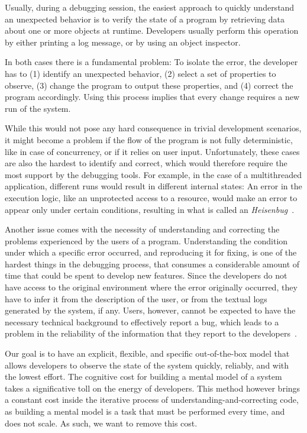 Usually, during a debugging session, the easiest approach to quickly understand an unexpected behavior is to verify the state of a program by retrieving data about one or more objects at runtime. Developers usually perform this operation by either printing a log message, or by using an object inspector.

In both cases there is a fundamental problem: To isolate the error, the developer has to (1) identify an unexpected behavior, (2) select a set of properties to observe, (3) change the program to output these properties, and (4) correct the program accordingly. Using this process implies that every change requires a new run of the system.

While this would not pose any hard consequence in trivial development scenarios, it might become a problem if the flow of the program is not fully deterministic, like in case of concurrency, or if it relies on user input. Unfortunately, these cases are also the hardest to identify and correct, which would therefore require the most support by the debugging tools. For example, in the case of a multithreaded application, different runs would result in different internal states: An error in the execution logic, like an unprotected access to a resource, would make an error to appear only under certain conditions, resulting in what is called an \emph{Heisenbug}~\cite{Grot2005}.

Another issue comes with the necessity of understanding and correcting the problems experienced by the users of a program. Understanding the condition under which a specific error occurred, and reproducing it for fixing, is one of the hardest things in the debugging process, that consumes a considerable amount of time that could be spent to develop new features. Since the developers do not have access to the original environment where the error originally occurred, they have to infer it from the description of the user, or from the textual logs generated by the system, if any. Users, however, cannot be expected to have the necessary technical background to effectively report a bug, which leads to a problem in the reliability of the information that they report to the developers~\cite{Zimm2010a}.

Our goal is to have an explicit, flexible, and specific out-of-the-box model that allows developers to observe the state of the system quickly, reliably, and with the lowest effort.
The cognitive cost for building a mental model of a system takes a significative toll on the energy of developers.
This method however brings a constant cost inside the iterative process of understanding-and-correcting code, as building a mental model is a task that must be performed every time, and does not scale.
As such, we want to remove this cost.

